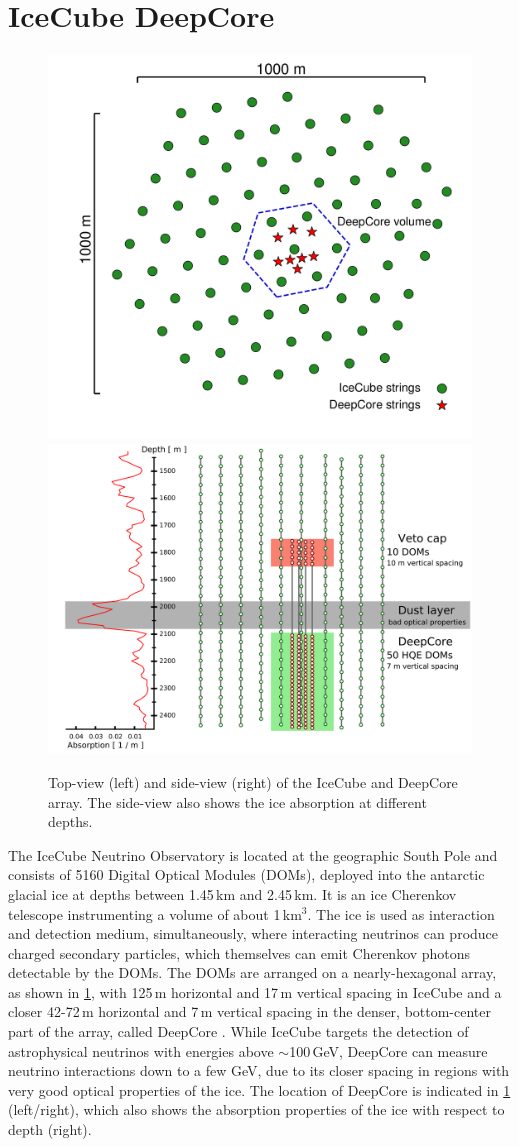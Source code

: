 \documentclass[a4paper,11pt]{article}
\begin{document}
\vspace{-0.75cm}
\section{IceCube DeepCore}

\begin{figure}[h!]
  \includegraphics[width=.43\linewidth]{figures/icecube_top_view_bw.pdf}
  \includegraphics[width=.52\linewidth]{figures/DeepCore_sideview.png}
  \caption{Top-view (left) and side-view (right) of the IceCube and DeepCore array. The side-view also shows the ice absorption at different depths.}
  \label{fig:icecube_array}
\end{figure}

The IceCube Neutrino Observatory \cite{Aartsen:2016nxy} is located at the geographic South Pole and consists of 5160 Digital Optical Modules (DOMs), deployed into the antarctic glacial ice at depths between 1.45\,km and 2.45\,km. It is an ice Cherenkov telescope instrumenting a volume of about 1\,km$^{3}$. The ice is used as interaction and detection medium, simultaneously, where interacting neutrinos can produce charged secondary particles, which themselves can emit Cherenkov photons detectable by the DOMs. The DOMs are arranged on a nearly-hexagonal array, as shown in \cref{fig:icecube_array}, with 125\,m horizontal and 17\,m vertical spacing in IceCube and a closer 42-72\,m horizontal and 7\,m vertical spacing in the denser, bottom-center part of the array, called DeepCore \cite{IceCube:2011ucd}. While IceCube targets the detection of astrophysical neutrinos with energies above $\sim$100\,GeV, DeepCore can measure neutrino interactions down to a few GeV, due to its closer spacing in regions with very good optical properties of the ice. The location of DeepCore is indicated in \cref{fig:icecube_array} (left/right), which also shows the absorption properties of the ice with respect to depth (right).
\end{document}
